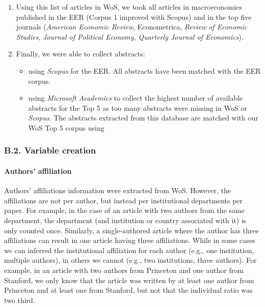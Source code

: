 \documentclass[]{elsarticle} %
\providecommand{\tightlist}{%
  \setlength{\itemsep}{0pt}\setlength{\parskip}{0pt}}
\begin{document}
\begin{enumerate}
\def\labelenumi{\arabic{enumi}.}
\setcounter{enumi}{2}
\item
  Using this list of articles in WoS, we took all articles in
  macroeconomics published in the EER (Corpus 1 improved with Scopus)
  and in the top five journals (\emph{American Economic Review},
  Econometrica, \emph{Review of Economic Studies}, \emph{Journal of
  Political Economy}, \emph{Quarterly Journal of Economics}).
\item
  Finally, we were able to collect abstracts:

  \begin{itemize}
  \tightlist
  \item
    using \emph{Scopus} for the EER. All abstracts have been matched
    with the EER corpus.
  \item
    using \emph{Microsoft Academics} to collect the highest number of
    available abstracts for the Top 5 as too many abstracts were missing
    in WoS or \emph{Scopus}. The abstracts extracted from this database
    are matched with our WoS Top 5 corpus using
  \end{itemize}
\end{enumerate}

\hypertarget{b.2.-variable-creation}{%
\subsubsection*{B.2. Variable creation}\label{b.2.-variable-creation}}

\hypertarget{author-affiliation}{%
\paragraph*{Authors' affiliation}\label{author-affiliation}}

Authors' affiliations information were extracted from WoS. However, the
affiliations are not per author, but instead per institutional
departments per paper. For example, in the case of an article with two
authors from the same department, the department (and institution or
country associated with it) is only counted once. Similarly, a
single-authored article where the author has three affiliations can
result in one article having three affiliations. While in some cases we
can inferred the institutional affiliation for each author (e.g., one
institution, multiple authors), in others we cannot (e.g., two
institutions, three authors). For example, in an article with two
authors from Princeton and one author from Stanford, we only know that
the article was written by at least one author from Princeton and at
least one from Stanford, but not that the individual ratio was two
third.
\end{document}
